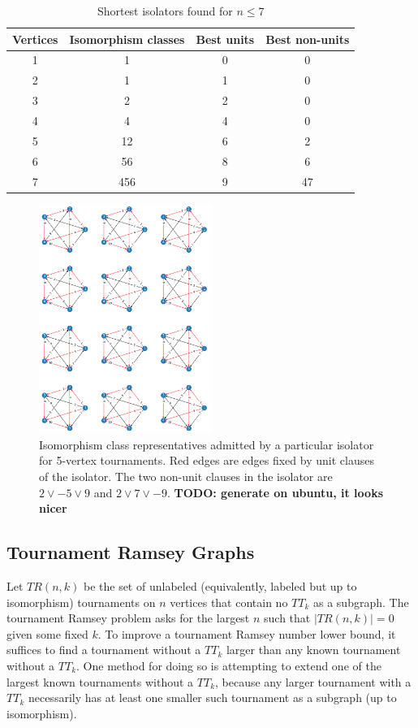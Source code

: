 \documentclass[conference]{IEEEtran}
\begin{document}
\begin{table}[ht]
    \centering
        \caption{Shortest isolators found for $n\le 7$}
    \begin{tabular}{c|c|c|c}
        Vertices & Isomorphism classes &Best units & Best non-units  \\ \hline
        1&1&0&0\\ 
        2&1&1&0\\ 
        3&2&2&0\\ 
        4&4&4&0\\
        5&12&6&2\\ 
        6&56&8&6\\ 
        7&456&9&47\\ 
    \end{tabular}

    \label{tab:smallest_isolators_found}
\end{table}

\begin{figure}
\centering
\includegraphics[width=0.5\textwidth]{iso_5.png}
\caption{Isomorphism class representatives admitted by a particular isolator for 5-vertex tournaments. Red edges are edges fixed by unit clauses of the isolator. The two non-unit clauses in the isolator are $2 \lor -5 \lor 9$ and $2 \lor 7 \lor -9$. \textbf{TODO: generate on ubuntu, it looks nicer}} \label{fig2}
\end{figure}

\subsection{Tournament Ramsey Graphs}

Let $TR(n, k)$ be the set of unlabeled (equivalently, labeled but up to isomorphism) tournaments on $n$ vertices that contain no $TT_k$ as a subgraph. The tournament Ramsey problem asks for the largest $n$ such that $|TR(n, k)| = 0$ given some fixed $k$. To improve a tournament Ramsey number lower bound, it suffices to find a tournament without a $TT_k$ larger than any known tournament without a $TT_k$. One method for doing so is attempting to extend one of the largest known tournaments without a $TT_k$, because any larger tournament with a $TT_k$ necessarily has at least one smaller such tournament as a subgraph (up to isomorphism).
\end{document}
